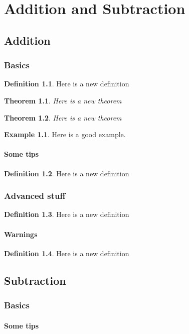 \documentclass[11pt,a4paper]{report}
\theoremstyle{plain}
\newtheorem{thm}{Theorem}[section]
\theoremstyle{definition}
\newtheorem{defn}{Definition}[section]
\newtheorem{exmp}{Example}[section]
\theoremstyle{remark}
\begin{document}
	\tableofcontents
	
	\part{Addition and Subtraction}
	
	\chapter{Addition}
	\section{Basics}
	\begin{defn}
		Here is a new definition
	\end{defn}
	
	\begin{thm}
		Here is a new theorem
	\end{thm}
	\begin{thm}
		Here is a new theorem
	\end{thm}
	\begin{exmp}
		Here is a good example.
	\end{exmp}
	\subsection{Some tips}
	\begin{defn}
		Here is a new definition
	\end{defn}
	\section{Advanced stuff}
	\begin{defn}
		Here is a new definition
	\end{defn}
	\subsection{Warnings}
	\begin{defn}
		Here is a new definition
	\end{defn}
	
	\chapter{Subtraction}
	\section{Basics}
	\subsection{Some tips}
\end{document}
